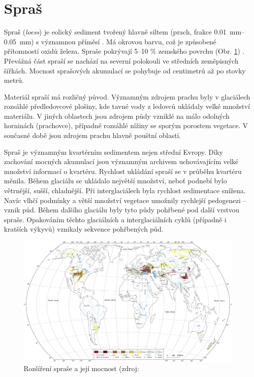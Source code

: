 \section{Spraš}
Spraš (\textit{loess}) je eolický sediment tvořený hlavně siltem (prach, frakce \SIrange{0,01}{0,05}{\milli\metre}) s významnou příměsí . Má okrovou barvu, což je způsobené přítomností oxidů železa. Spraše pokrývají 5--10 \% zemského povrchu (Obr. \ref{fig:spras_distribuce}) \textcite{biermanKeyConceptsGeomorphology2014}. Převážná část spraší se nachází na severní polokouli ve středních zeměpisných šířkách. Mocnost sprašových akumulací se pohybuje od centimetrů až po stovky metrů. 

Materiál spraší má rozličný původ. Významným zdrojem prachu byly v glaciálech rozsáhlé předledovcové plošiny, kde tavné vody z ledovců ukládaly velké množství materiálu. V jiných oblastech jsou zdrojem půdy vzniklé na málo odolných horninách (prachovce), případně rozsáhlé nížiny se sporým porostem vegetace. V současné době jsou zdrojem prachu hlavně pouštní oblasti.

Spraš je významným kvartérním sedimentem nejen střední Evropy. Díky zachování mocných akumulací jsou významným archivem uchovávajícím velké množství informací o kvartéru. Rychlost ukládání spraší se v průběhu kvartéru měnila. Během glaciálu se ukládalo největší množství, neboť podnebí bylo větrnější, sušší, chladnější. Při interglaciálech byla rychlost sedimentace snížena. Navíc vlhčí podmínky a větší množství vegetace umožnily rychlejší pedogenezi -- vznik půd. Během dalšího glaciálu byly tyto půdy pohřbené pod další vrstvou spraše. Opakováním těchto glaciálních a interglaciálních cyklů (případně i kratších výkyvů) vznikaly sekvence pohřbených půd. 

\begin{landscape}
	\begin{figure}
		\centering
		\includegraphics[width=1\linewidth]{obrazky/eolicka/loes_distr}
		\caption{Rozšíření spraše a její mocnost (zdroj: \textcite{liLoessGenesisWorldwide2020}}
		\label{fig:spras_distribuce}
	\end{figure}
\end{landscape}


